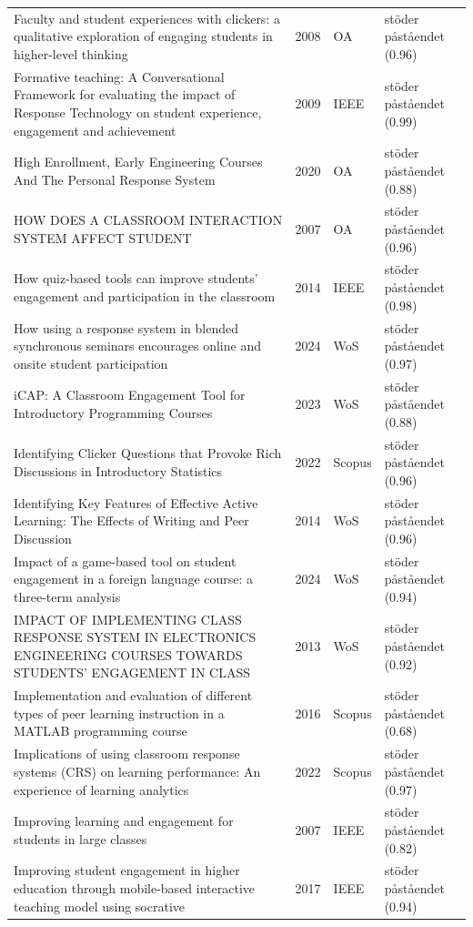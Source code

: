 \begin{longtable}{@{}%
  >{\raggedright\arraybackslash}p{}c%
  >{\raggedright\arraybackslash}p{}%
  >{\raggedright\arraybackslash}p{}@{}}
Faculty and student experiences with clickers: a qualitative exploration of engaging students in higher-level thinking & 2008 & OA & stöder påståendet (0.96) \\
Formative teaching: A Conversational Framework for evaluating the impact of Response Technology on student experience, engagement and achievement & 2009 & IEEE & stöder påståendet (0.99) \\
High Enrollment, Early Engineering Courses And The Personal Response System & 2020 & OA & stöder påståendet (0.88) \\
HOW DOES A CLASSROOM INTERACTION SYSTEM AFFECT STUDENT & 2007 & OA & stöder påståendet (0.96) \\
How quiz-based tools can improve students' engagement and participation in the classroom & 2014 & IEEE & stöder påståendet (0.98) \\
How using a response system in blended synchronous seminars encourages online and onsite student participation & 2024 & WoS & stöder påståendet (0.97) \\
iCAP: A Classroom Engagement Tool for Introductory Programming Courses & 2023 & WoS & stöder påståendet (0.88) \\
Identifying Clicker Questions that Provoke Rich Discussions in Introductory Statistics & 2022 & Scopus & stöder påståendet (0.96) \\
Identifying Key Features of Effective Active Learning: The Effects of Writing and Peer Discussion & 2014 & WoS & stöder påståendet (0.96) \\
Impact of a game-based tool on student engagement in a foreign language course: a three-term analysis & 2024 & WoS & stöder påståendet (0.94) \\
IMPACT OF IMPLEMENTING CLASS RESPONSE SYSTEM IN ELECTRONICS ENGINEERING COURSES TOWARDS STUDENTS' ENGAGEMENT IN CLASS & 2013 & WoS & stöder påståendet (0.92) \\
Implementation and evaluation of different types of peer learning instruction in a MATLAB programming course & 2016 & Scopus & stöder påståendet (0.68) \\
Implications of using classroom response systems (CRS) on learning performance: An experience of learning analytics & 2022 & Scopus & stöder påståendet (0.97) \\
Improving learning and engagement for students in large classes & 2007 & IEEE & stöder påståendet (0.82) \\
Improving student engagement in higher education through mobile-based interactive teaching model using socrative & 2017 & IEEE & stöder påståendet (0.94) \\

\end{longtable}
